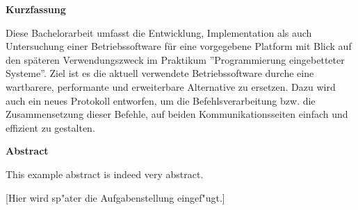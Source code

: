 \documentclass[11pt,twoside]{scrbook}
\begin{document}

\centerline{\bf Kurzfassung}

Diese Bachelorarbeit umfasst die Entwicklung, Implementation als auch Untersuchung einer
Betriebssoftware für eine vorgegebene Platform mit Blick auf den späteren Verwendungszweck
im Praktikum ''Programmierung eingebetteter Systeme''. Ziel ist es die aktuell verwendete
Betriebssoftware durche eine wartbarere, performante und erweiterbare Alternative zu
ersetzen. Dazu wird auch ein neues Protokoll entworfen, um die Befehlsverarbeitung bzw.
die Zusammensetzung dieser Befehle, auf beiden Kommunikationsseiten einfach und effizient
zu gestalten.

%
\vskip 3cm
%

\centerline{\bf Abstract}

This example abstract is indeed very abstract.

\cleardoublepage

\vspace*{7cm}
\centerline{[Hier wird sp"ater die Aufgabenstellung eingef"ugt.]}




\tableofcontents		%
\cleardoublepage
\listoffigures			%
\cleardoublepage
\listoftables			%
\cleardoublepage



\setcounter{page}{0}

\pagestyle{headings}


\cleardoublepage

\cleardoublepage

\cleardoublepage

\cleardoublepage
\cleardoublepage

\cleardoublepage

\cleardoublepage




\begin{appendix}


\end{appendix}
\end{document}
